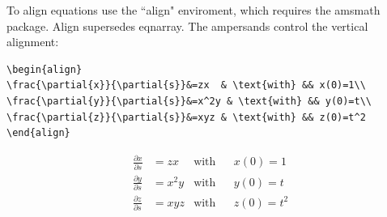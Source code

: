 To align equations use the ``align" enviroment, which requires the amsmath package. Align
supersedes eqnarray. The ampersands control the vertical alignment:
\begin{verbatim}
\begin{align}
\frac{\partial{x}}{\partial{s}}&=zx  & \text{with} && x(0)=1\\
\frac{\partial{y}}{\partial{s}}&=x^2y & \text{with} && y(0)=t\\
\frac{\partial{z}}{\partial{s}}&=xyz & \text{with} && z(0)=t^2
\end{align}
\end{verbatim}

\begin{align}
\frac{\partial{x}}{\partial{s}}&=zx  & \text{with} && x(0)=1\\
\frac{\partial{y}}{\partial{s}}&=x^2y & \text{with} && y(0)=t\\
\frac{\partial{z}}{\partial{s}}&=xyz & \text{with} && z(0)=t^2
\end{align}



